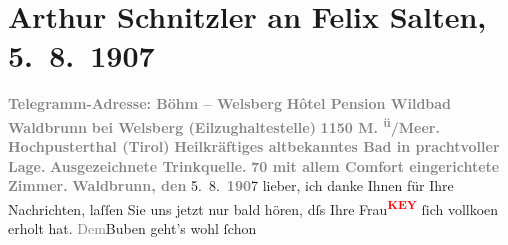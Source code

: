                \section[Arthur Schnitzler an Felix Salten, 5. 8. 1907]{ Arthur Schnitzler an Felix Salten, 5. 8. 1907}\nopagebreak{}\rehead{ }\begin{ledgroupsized}[t]{13cm}\normalsize\beginnumbering \toendnotes[C]{\smallbreak\pagebreak[2]} 
\toendnotes[C]{\smallbreak}\pstart
           \noindent{}{\pb}\textcolor{gray}{\textbf{Telegramm-Adresse: Böhm – Welsberg}}\pend
           \pstart
           \textcolor{gray}{\textbf{
                     Hôtel
                     {\kaufmannsund}
                     Pension
                     Wildbad Waldbrunn}}\pend
           \pstart
           \textcolor{gray}{\textbf{
                     bei
                     Welsberg
                     (Eilzughaltestelle)
                  }}\pend
           \pstart
           \textcolor{gray}{\textbf{
                     1150 M.
                     \textsuperscript{ü}/Meer.
                     \hspace*{1.5em}Hochpusterthal
                     (Tirol)
                  }}\pend
           \pstart
           \textcolor{gray}{\textbf{
                     Heilkräftiges altbekanntes Bad in prachtvoller Lage.
                  }}\pend
           \pstart
           \textcolor{gray}{\textbf{Ausgezeichnete Trinkquelle.}}\pend
           \pstart
           \textcolor{gray}{\textbf{70 mit allem Comfort eingerichtete Zimmer.}}\pend
           \pstart
           \raggedleft{}\textcolor{gray}{\textbf{Waldbrunn, den
                  }}{ }5. 8. \textcolor{gray}{\textbf{190}}7\pend
           \pstart
           lieber, ich danke Ihnen für Ihre Nachrichten, laſſen Sie uns jetzt
               nur bald hören, dſs Ihre Frau\textcolor{red}{\textsuperscript{\textbf{KEY}}} ſich
                  vollko{\geminationm}en erholt hat. \textcolor{gray}{Dem}Buben geht’s wohl ſchon

\end{ledgroupsized}
